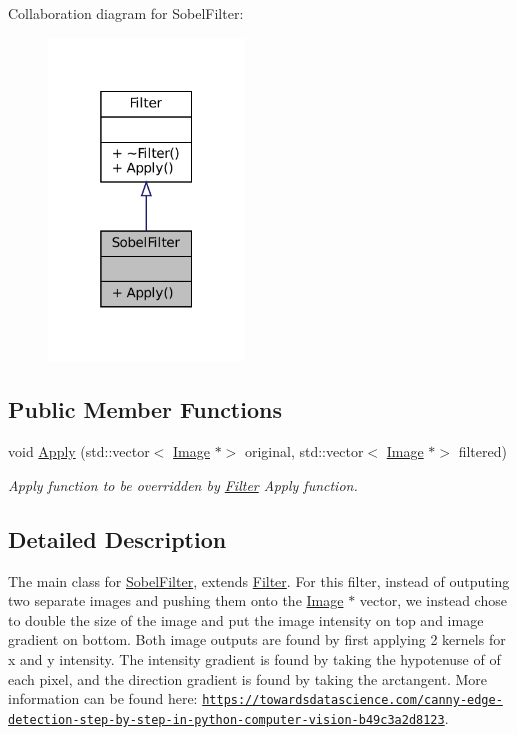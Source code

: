 Collaboration diagram for Sobel\+Filter\+:\nopagebreak
\begin{figure}[H]
\begin{center}
\leavevmode
\includegraphics[width=148pt]{classSobelFilter__coll__graph}
\end{center}
\end{figure}
\subsection*{Public Member Functions}
\begin{DoxyCompactItemize}
\item 
\mbox{\label{classSobelFilter_a1934ab9f9e3841fa271d5640f0d35d94}} 
void \hyperlink{classSobelFilter_a1934ab9f9e3841fa271d5640f0d35d94}{Apply} (std\+::vector$<$ \hyperlink{classImage}{Image} $\ast$$>$ original, std\+::vector$<$ \hyperlink{classImage}{Image} $\ast$$>$ filtered)
\begin{DoxyCompactList}\small\item\em Apply function to be overridden by \hyperlink{classFilter}{Filter} Apply function. \end{DoxyCompactList}\end{DoxyCompactItemize}


\subsection{Detailed Description}
The main class for \hyperlink{classSobelFilter}{Sobel\+Filter}, extends \hyperlink{classFilter}{Filter}. For this filter, instead of outputing two separate images and pushing them onto the \hyperlink{classImage}{Image} $\ast$ vector, we instead chose to double the size of the image and put the image intensity on top and image gradient on bottom. Both image outputs are found by first applying 2 kernels for x and y intensity. The intensity gradient is found by taking the hypotenuse of of each pixel, and the direction gradient is found by taking the arctangent. More information can be found here\+: \href{https://towardsdatascience.com/canny-edge-detection-step-by-step-in-python-computer-vision-b49c3a2d8123}{\tt https\+://towardsdatascience.\+com/canny-\/edge-\/detection-\/step-\/by-\/step-\/in-\/python-\/computer-\/vision-\/b49c3a2d8123}. 

